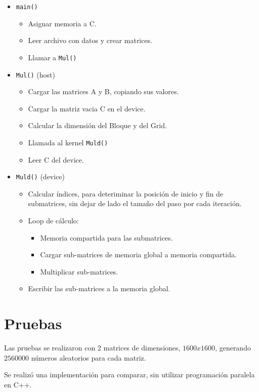 \begin{itemize}
	\item \texttt{main()}
	\begin{itemize}
		\item Asignar memoria a C.
		\item Leer archivo con datos y crear matrices.
		\item Llamar a \texttt{Mul()}
	\end{itemize}
	\item \texttt{Mul()} (host)
	\begin{itemize}
		\item Cargar las matrices A y B, copiando sus valores.
		\item Cargar la matriz vacia C en el device.
		\item Calcular la dimensión del Bloque y del Grid.
		\item Llamada al kernel \texttt{Muld()}
		\item Leer C del device.
	\end{itemize}
	\item \texttt{Muld()} (device)
	\begin{itemize}
		\item Calcular índices, para deteriminar la posición de inicio y fin de submatrices,
		sin dejar de lado el tamaño del paso por cada iteración.
		\item Loop de cálculo:
		 \begin{itemize}
		 	\item Memoria compartida para las submatrices.
			\item Cargar sub-matrices de memoria global a memoria compartida.
			\item Multiplicar sub-matrices.
		 \end{itemize}
		\item Escribir las sub-matrices a la memoria global.
	\end{itemize}
\end{itemize}

\section{Pruebas}

Las pruebas se realizaron con 2 matrices de dimensiones,
$1600x1600$, generando $2560000$ números aleatorios
para cada matriz.

Se realizó una implementación para comparar,
sin utilizar programación paralela en C++.

